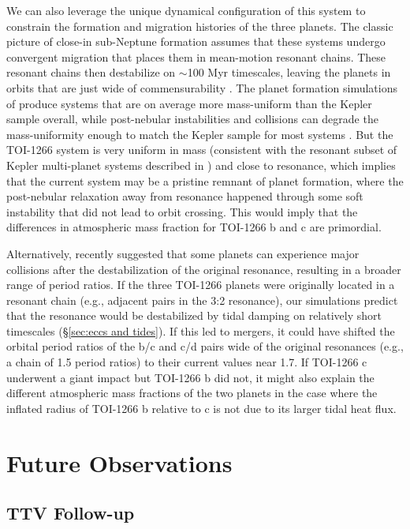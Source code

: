 \documentclass[twocolumn]{aastex631}
\begin{document}
We can also leverage the unique dynamical configuration of this system to constrain the formation and migration histories of the three planets. The classic picture of close-in sub-Neptune formation assumes that these systems undergo convergent migration that places them in mean-motion resonant chains. These resonant chains then destabilize on $\sim$100 Myr timescales, leaving the planets in orbits that are just wide of commensurability \citep{Batygin_Morbi_2023}. The planet formation simulations of \cite{Batygin_Morbi_2023} produce systems that are on average more mass-uniform than the Kepler sample overall, while post-nebular instabilities and collisions can degrade the mass-uniformity enough to match the Kepler sample for most systems \citep{Goldberg_2022}. But the TOI-1266 system is very uniform in mass (consistent with the resonant subset of Kepler multi-planet systems described in \cite{Goldberg_2021}) and close to resonance, which implies that the current system may be a pristine remnant of planet formation, where the post-nebular relaxation away from resonance happened through some soft instability that did not lead to orbit crossing. This would imply that the differences in atmospheric mass fraction for TOI-1266 b and c are primordial.

Alternatively, \cite{Li2024} recently suggested that some planets can experience major collisions after the destabilization of the original resonance, resulting in a broader range of period ratios. If the three TOI-1266 planets were originally located in a resonant chain (e.g., adjacent pairs in the 3:2 resonance), our simulations predict that the resonance would be destabilized by tidal damping on relatively short timescales (\S\ref{sec:eccs and tides}). If this led to mergers, it could have shifted the orbital period ratios of the b/c and c/d pairs wide of the original resonances (e.g., a chain of 1.5 period ratios) to their current values near 1.7. If TOI-1266 c underwent a giant impact but TOI-1266 b did not, it might also explain the different atmospheric mass fractions of the two planets in the case where the inflated radius of TOI-1266 b relative to c is not due to its larger tidal heat flux. 



\section{Future Observations} \label{sec:future obs}

\subsection{TTV Follow-up}
\end{document}
